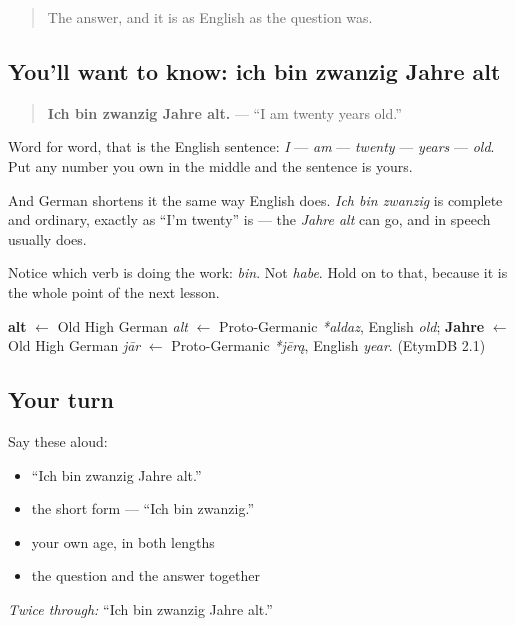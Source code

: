 \begin{quote}
The answer, and it is as English as the question was.
\end{quote}

\subsection*{You'll want to know: ich bin zwanzig Jahre alt}
\begin{quote}
\textbf{Ich bin zwanzig Jahre alt.} — \textquotedblleft{}I am twenty years old.\textquotedblright{}
\end{quote}

Word for word, that is the English sentence: \emph{I} — \emph{am} — \emph{twenty} — \emph{years} — \emph{old}. Put any number you own in the middle and the sentence is yours.

And German shortens it the same way English does. \emph{Ich bin zwanzig} is complete and ordinary, exactly as \textquotedblleft{}I'm twenty\textquotedblright{} is — the \emph{Jahre alt} can go, and in speech usually does.

Notice which verb is doing the work: \emph{bin}. Not \emph{habe}. Hold on to that, because it is the whole point of the next lesson.

\begin{cousinweb}
\textbf{alt} $\leftarrow$ Old High German \emph{alt} $\leftarrow$ Proto-Germanic \emph{*aldaz}, English \emph{old}; \textbf{Jahre} $\leftarrow$ Old High German \emph{jār} $\leftarrow$ Proto-Germanic \emph{*jērą}, English \emph{year}. (EtymDB 2.1)
\end{cousinweb}

\subsection*{Your turn}
Say these aloud:

\begin{itemize}
\raggedright
  \item \textquotedblleft{}Ich bin zwanzig Jahre alt.\textquotedblright{}
  \item the short form — \textquotedblleft{}Ich bin zwanzig.\textquotedblright{}
  \item your own age, in both lengths
  \item the question and the answer together
\end{itemize}

\emph{Twice through:} \textquotedblleft{}Ich bin zwanzig Jahre alt.\textquotedblright{}

